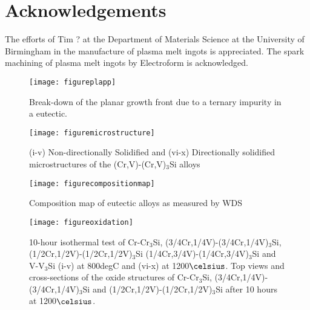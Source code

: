 \documentclass[preprint]{elsarticle}
\begin{document}
\section{Acknowledgements}

The efforts of Tim ? at the Department of Materials Science at the University of Birmingham in the manufacture of plasma melt ingots is appreciated.
The spark machining of plasma melt ingots by Electroform is acknowledged.



%

\begin{figure*}[t]
\begin{center}
\texttt{[image: figureplapp]}
\end{center}
\caption{Break-down of the planar growth front due to a ternary impurity in a eutectic.} 
\label{fig:fig1}
\end{figure*}

\begin{figure*}[t]
\begin{center}
\texttt{[image: figuremicrostructure]}
\end{center}
\caption{(i-v) Non-directionally Solidified and (vi-x) Directionally solidified microstructures of the (Cr,V)-(Cr,V)$_3$Si alloys} 
\label{fig:fig2}
\end{figure*}

\begin{figure*}[t]
\begin{center}
\texttt{[image: figurecompositionmap]}
\end{center}
\caption{Composition map of eutectic alloys as measured by WDS} 
\label{fig:fig3}
\end{figure*}

\begin{figure*}[t]
\begin{center}
\texttt{[image: figureoxidation]}
\end{center}
\caption{10-hour isothermal test of Cr-Cr$_3$Si, (3/4Cr,1/4V)-(3/4Cr,1/4V)$_3$Si, (1/2Cr,1/2V)-(1/2Cr,1/2V)$_3$Si (1/4Cr,3/4V)-(1/4Cr,3/4V)$_3$Si and V-V$_3$Si (i-v) at 800degC and (vi-x) at 1200$\celsius$. 
Top views and cross-sections of the oxide structures of Cr-Cr$_3$Si, (3/4Cr,1/4V)-(3/4Cr,1/4V)$_3$Si and (1/2Cr,1/2V)-(1/2Cr,1/2V)$_3$Si after 10 hours at 1200$\celsius$.} 
\label{fig:fig4}
\end{figure*}
\end{document}
